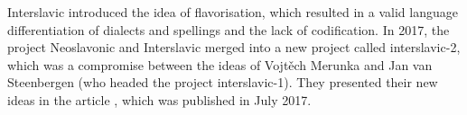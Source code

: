 Interslavic introduced the idea of flavorisation, which resulted in a valid language differentiation of dialects and spellings and the lack of codification. In 2017, the project Neoslavonic and Interslavic merged into a new project called interslavic-2, which was a compromise between the ideas of Vojtěch Merunka and Jan van Steenbergen (who headed the project interslavic-1). They presented their new ideas in the article \cite{interslavic-2}, which was published in July 2017.